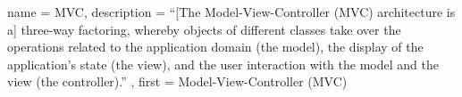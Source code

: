 






{
  name        = MVC,
  description = {"`[The Model-View-Controller (MVC) architecture is a] three-way factoring, whereby objects of different classes take over the operations related to the application domain (the model), the display of the application's state (the view), and the user interaction with the model and the view (the controller)."' \cite[vgl.][S.~1]{mvc}},
  first       = {Model-View-Controller (MVC)}
}